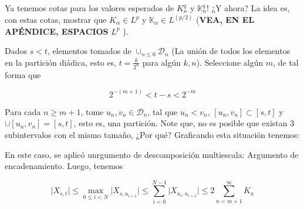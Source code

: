 Ya tenemos cotas para los valores esperados de $K_n^q$ y $\mathbb{K}_n^q$! ¿Y ahora? La idea es, con estas cotas, mostrar que $K_{\alpha} \in L^p$ y $\mathbb{K}_{\alpha} \in L^(p/2)$ (\textbf{VEA, EN EL APÉNDICE, ESPACIOS} $L^p$ ).



\begin{comment}

Fije $s < t$ en $\cup_{n \leq 0} \mathcal{D}_n$ (La unión de todos los elementos en la partición diádica, esto es, $t = \frac{k}{2^n}$ para algún $k, n$). Seleccione $m$, de tal forma que $2^{-(m+1)} < t - s < 2^{-m} $. 

Note que, $[s,t]$ se puede expresar como la unión finita de intervalos de la forma $[u, v] \in \mathcal{D}_n$, con $n > m + 1$ donde no hay tres intervalos con el mismo tamaño. (Creo que ya entendí :D... ). Dicho de otra forma, tenemos una partición de $[s, t]$ de la forma

\[
	s = u_0 < u_1 < \cdots < u_N = t
\]

donde $[u_i, u_{i+1}] \in \mathcal{D}_n$ para algún $n > m + 1$, y para cada $n \geq m + 1$, hay a lo sumo, dos intervalos tomados de $\mathcal{D_n}$. Argumento de descomposición multiescala: Argumento de encadenamiento.

\[
	\lvert X_{s,t} \rvert \leq \max_{0 \leq i < N} \lvert X_{s, u_{i+1} } \rvert \leq \sum_{i = 0}^{N-1} \lvert X_{u_i, u_{i+1} } \rvert \leq 2 \sum_{n = m+1}^{\infty} K_n
\]

\end{comment}

Dados $s < t$, elementos tomados de $\cup_{n \leq 0} \mathcal{D}_n$ (La unión de todos los elementos en la partición diádica, esto es, $t = \frac{k}{2^n}$ para algún $k, n$). Seleccione algún $m$, de tal forma que 

\[
	2^{-(m + 1)} < t - s < 2^{-m}
\]

Para cada $n \geq m+1$, tome $u_n, v_n \in \mathcal{D}_n$, tal que $u_n < v_n$, $[u_n, v_n] \subset [s,t]$ y $\cup [u_n, v_n] = [s,t]$, esto es, una partición. Note que, no es posible que existan 3 subintervalos con el mismo tamaño, ¿Por qué? Graficando esta situación tenemos:


En este caso, se aplicó unrgumento de descomposición multiescala: Argumento de encadenamiento. Luego, tenemos

\[
	\lvert X_{s,t} \rvert \leq \max_{0 \leq i < N} \lvert X_{s, u_{i+1} } \rvert \leq \sum_{i = 0}^{N-1} \lvert X_{u_i, u_{i+1} } \rvert \leq 2 \sum_{n = m+1}^{\infty} K_n
\]

